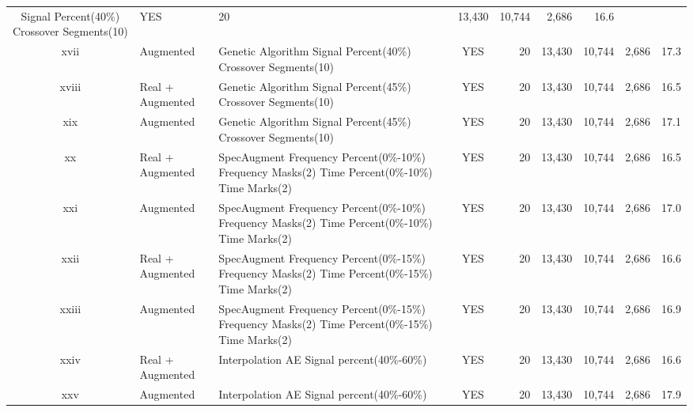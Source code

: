 \documentclass[lettersize,journal]{IEEEtran}
\begin{document}
\begin{table}
\begin{adjustbox}{width=\textwidth}
\begin{tabular}{cllcrrrrr}
  Signal Percent(40\%) Crossover Segments(10) & YES & 20 & 13,430 & 10,744 & 2,686 & 16.6 \\
xvii & Augmented & Genetic Algorithm Signal Percent(40\%) Crossover
  Segments(10) & YES & 20 & 13,430 & 10,744 & 2,686 & 17.3 \\
xviii & Real + Augmented & Genetic Algorithm
  Signal Percent(45\%) Crossover Segments(10) & YES & 20 & 13,430 & 10,744 & 2,686 & 16.5 \\
xix & Augmented & Genetic Algorithm Signal Percent(45\%) Crossover
  Segments(10) & YES & 20 & 13,430 & 10,744 & 2,686 & 17.1 \\
xx & Real + Augmented & SpecAugment
  Frequency Percent(0\%-10\%) Frequency Masks(2) Time Percent(0\%-10\%) Time
  Marks(2) & YES & 20 & 13,430 & 10,744 & 2,686 & 16.5 \\
xxi & Augmented & SpecAugment Frequency Percent(0\%-10\%) Frequency
  Masks(2) Time Percent(0\%-10\%) Time Marks(2) & YES & 20 & 13,430 & 10,744 & 2,686 & 17.0 \\
xxii & Real + Augmented & SpecAugment
  Frequency Percent(0\%-15\%) Frequency Masks(2) Time Percent(0\%-15\%) Time Marks(2) & YES & 20 & 13,430 & 10,744 & 2,686 & 16.6 \\
xxiii & Augmented & SpecAugment Frequency Percent(0\%-15\%) Frequency
  Masks(2) Time Percent(0\%-15\%) Time Marks(2) & YES & 20 & 13,430 & 10,744 & 2,686 & 16.9 \\
xxiv & Real + Augmented & Interpolation AE Signal percent(40\%-60\%) & YES & 20 & 13,430 & 10,744 & 2,686 & 16.6 \\
xxv & Augmented & Interpolation
  AE Signal percent(40\%-60\%) & YES & 20 & 13,430 & 10,744 & 2,686 & 17.9 \\
\hline %
\end{tabular}
\end{adjustbox}
\label{table:training_statistic}
\end{table}
\end{document}
